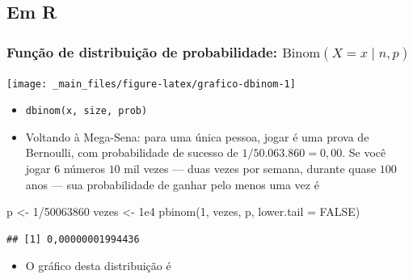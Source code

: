 \documentclass[
  11pt]{report}
\newenvironment{Shaded}{\begin{snugshade}}{\end{snugshade}}
\newcommand{\AttributeTok}[1]{\textcolor[rgb]{0.77,0.63,0.00}{#1}}
\newcommand{\ConstantTok}[1]{\textcolor[rgb]{0.00,0.00,0.00}{#1}}
\newcommand{\DecValTok}[1]{\textcolor[rgb]{0.00,0.00,0.81}{#1}}
\newcommand{\FloatTok}[1]{\textcolor[rgb]{0.00,0.00,0.81}{#1}}
\newcommand{\FunctionTok}[1]{\textcolor[rgb]{0.00,0.00,0.00}{#1}}
\newcommand{\NormalTok}[1]{#1}
\newcommand{\OtherTok}[1]{\textcolor[rgb]{0.56,0.35,0.01}{#1}}
\newcommand{\SpecialCharTok}[1]{\textcolor[rgb]{0.00,0.00,0.00}{#1}}
\providecommand{\tightlist}{%
  \setlength{\itemsep}{0pt}\setlength{\parskip}{0pt}}
\renewenvironment{Shaded}{
    \begin{mdframed}[%
      roundcorner=2pt,%
      innerleftmargin=5pt,%
      innerrightmargin=5pt,%
      topline=true,%
      leftline=true,%
      rightline=true,%
      bottomline=true,%
      linewidth=0.5pt,%
      linecolor=black!20,%
      backgroundcolor=black!2,%
      skipabove=2ex,%
      skipbelow=2.5ex%
    ]%
  }
  {
    \end{mdframed}
  }
\begin{document}
\hypertarget{em-r-3}{%
\subsection{Em R}\label{em-r-3}}

\hypertarget{funuxe7uxe3o-de-distribuiuxe7uxe3o-de-probabilidade-textbinomx-x-mid-n-p}{%
\subsubsection*{\texorpdfstring{Função de distribuição de probabilidade: $\text{Binom}(X = x \mid n, p)$}{Função de distribuição de probabilidade: }}\label{funuxe7uxe3o-de-distribuiuxe7uxe3o-de-probabilidade-textbinomx-x-mid-n-p}}

\begin{center}\texttt{[image: \_main\_files/figure-latex/grafico-dbinom-1]} \end{center}

\begin{itemize}
\item
  \texttt{dbinom(x,\ size,\ prob)}
\item
  Voltando à Mega-Sena: para uma única pessoa, jogar é uma prova de Bernoulli, com probabilidade de sucesso de $1/50.063.860 = 0{,}00$. Se você jogar $6$ números $10$ mil vezes --- duas vezes por semana, durante quase $100$ anos --- sua probabilidade de ganhar pelo menos uma vez é
\end{itemize}

\begin{Shaded}
\begin{Highlighting}[]
\NormalTok{p }\OtherTok{\textless{}{-}} \DecValTok{1}\SpecialCharTok{/}\DecValTok{50063860}
\NormalTok{vezes }\OtherTok{\textless{}{-}} \FloatTok{1e4}
\FunctionTok{pbinom}\NormalTok{(}\DecValTok{1}\NormalTok{, vezes, p, }\AttributeTok{lower.tail =} \ConstantTok{FALSE}\NormalTok{)}
\end{Highlighting}
\end{Shaded}

\begin{verbatim}
## [1] 0,00000001994436
\end{verbatim}

\begin{itemize}
\tightlist
\item
  O gráfico desta distribuição é
\end{itemize}
\end{document}

